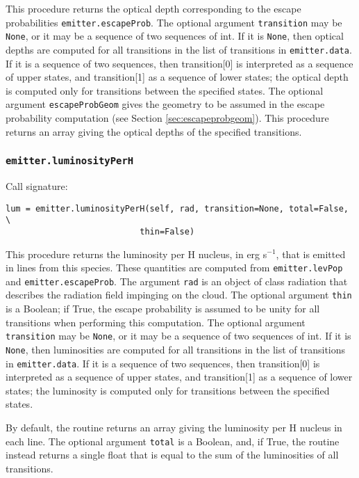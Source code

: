 \documentclass[12pt]{article}
\begin{document}
This procedure returns the optical depth corresponding to the escape probabilities \verb=emitter.escapeProb=. The optional argument \verb=transition= may be \verb=None=, or it may be a sequence of two sequences of int. If it is \verb=None=, then optical depths are computed for all transitions in the list of transitions in \verb=emitter.data=. If it is a sequence of two sequences, then transition[0] is interpreted as a sequence of upper states, and transition[1] as a sequence of lower states; the optical depth is computed only for transitions between the specified states. The optional argument \verb=escapeProbGeom= gives the geometry to be assumed in the escape probability computation (see Section \ref{sec:escapeprobgeom}). This procedure returns an array giving the optical depths of the specified transitions.


\subsubsection{\texttt{emitter.luminosityPerH}}

Call signature:
\begin{verbatim}
lum = emitter.luminosityPerH(self, rad, transition=None, total=False, \
                           thin=False)
\end{verbatim}

This procedure returns the luminosity per H nucleus, in erg s$^{-1}$, that is emitted in lines from this species. These quantities are computed from \verb=emitter.levPop= and \verb=emitter.escapeProb=. The argument \verb=rad= is an object of class radiation that describes the radiation field impinging on the cloud. The optional argument \verb=thin= is a Boolean; if True, the escape probability is assumed to be unity for all transitions when performing this computation. The optional argument \verb=transition= may be \verb=None=, or it may be a sequence of two sequences of int. If it is \verb=None=, then luminosities are computed for all transitions in the list of transitions in \verb=emitter.data=. If it is a sequence of two sequences, then transition[0] is interpreted as a sequence of upper states, and transition[1] as a sequence of lower states; the luminosity is computed only for transitions between the specified states.

By default, the routine returns an array giving the luminosity per H nucleus in each line. The optional argument \verb=total= is a Boolean, and, if True, the routine instead returns a single float that is equal to the sum of the luminosities of all transitions.
\end{document}
